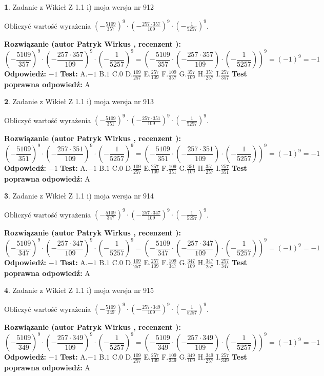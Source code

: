 \documentclass[12pt, a4paper]{article}
\theoremstyle{definition} %
\newtheorem{zad}{}
\newcommand{\zadStart}[1]{\begin{zad}#1\newline}
\newcommand{\zadStop}{\end{zad}}
\newcommand{\rozwStart}[2]{\noindent \textbf{Rozwiązanie (autor #1 , recenzent #2): }\newline}
\newcommand{\rozwStop}{\newline}
\newcommand{\odpStart}{\noindent \textbf{Odpowiedź:}\newline}
\newcommand{\odpStop}{\newline}
\newcommand{\testStart}{\noindent \textbf{Test:}\newline}
\newcommand{\testStop}{\newline}
\newcommand{\kluczStart}{\noindent \textbf{Test poprawna odpowiedź:}\newline}
\newcommand{\kluczStop}{\newline}
\begin{document}
\zadStart{Zadanie z Wikieł Z 1.1 i) moja wersja nr 912}

Obliczyć wartość wyrażenia $(-\frac{5109}{357})^{9} \cdot (-\frac{257 \cdot 357}{109})^{9} \cdot (-\frac{1}{5257})^{9}$.
\zadStop
\rozwStart{Patryk Wirkus}{}
$$(-\frac{5109}{357})^{9} \cdot (-\frac{257 \cdot 357}{109})^{9} \cdot (-\frac{1}{5257})^{9} = (-\frac{5109}{357} \cdot (-\frac{257 \cdot 357}{109}) \cdot (-\frac{1}{5257}))^{9} = (-1)^{9} = -1$$
\rozwStop
\odpStart
$-1$
\odpStop
\testStart
A.$-1$ B.$1$ C.$0$ D.$\frac{109}{257}$ E.$\frac{257}{109}$
F.$\frac{109}{357}$ G.$\frac{357}{109}$
H.$\frac{357}{257}$
I.$\frac{257}{357}$
\testStop
\kluczStart
A
\kluczStop



\zadStart{Zadanie z Wikieł Z 1.1 i) moja wersja nr 913}

Obliczyć wartość wyrażenia $(-\frac{5109}{351})^{9} \cdot (-\frac{257 \cdot 351}{109})^{9} \cdot (-\frac{1}{5257})^{9}$.
\zadStop
\rozwStart{Patryk Wirkus}{}
$$(-\frac{5109}{351})^{9} \cdot (-\frac{257 \cdot 351}{109})^{9} \cdot (-\frac{1}{5257})^{9} = (-\frac{5109}{351} \cdot (-\frac{257 \cdot 351}{109}) \cdot (-\frac{1}{5257}))^{9} = (-1)^{9} = -1$$
\rozwStop
\odpStart
$-1$
\odpStop
\testStart
A.$-1$ B.$1$ C.$0$ D.$\frac{109}{257}$ E.$\frac{257}{109}$
F.$\frac{109}{351}$ G.$\frac{351}{109}$
H.$\frac{351}{257}$
I.$\frac{257}{351}$
\testStop
\kluczStart
A
\kluczStop



\zadStart{Zadanie z Wikieł Z 1.1 i) moja wersja nr 914}

Obliczyć wartość wyrażenia $(-\frac{5109}{347})^{9} \cdot (-\frac{257 \cdot 347}{109})^{9} \cdot (-\frac{1}{5257})^{9}$.
\zadStop
\rozwStart{Patryk Wirkus}{}
$$(-\frac{5109}{347})^{9} \cdot (-\frac{257 \cdot 347}{109})^{9} \cdot (-\frac{1}{5257})^{9} = (-\frac{5109}{347} \cdot (-\frac{257 \cdot 347}{109}) \cdot (-\frac{1}{5257}))^{9} = (-1)^{9} = -1$$
\rozwStop
\odpStart
$-1$
\odpStop
\testStart
A.$-1$ B.$1$ C.$0$ D.$\frac{109}{257}$ E.$\frac{257}{109}$
F.$\frac{109}{347}$ G.$\frac{347}{109}$
H.$\frac{347}{257}$
I.$\frac{257}{347}$
\testStop
\kluczStart
A
\kluczStop



\zadStart{Zadanie z Wikieł Z 1.1 i) moja wersja nr 915}

Obliczyć wartość wyrażenia $(-\frac{5109}{349})^{9} \cdot (-\frac{257 \cdot 349}{109})^{9} \cdot (-\frac{1}{5257})^{9}$.
\zadStop
\rozwStart{Patryk Wirkus}{}
$$(-\frac{5109}{349})^{9} \cdot (-\frac{257 \cdot 349}{109})^{9} \cdot (-\frac{1}{5257})^{9} = (-\frac{5109}{349} \cdot (-\frac{257 \cdot 349}{109}) \cdot (-\frac{1}{5257}))^{9} = (-1)^{9} = -1$$
\rozwStop
\odpStart
$-1$
\odpStop
\testStart
A.$-1$ B.$1$ C.$0$ D.$\frac{109}{257}$ E.$\frac{257}{109}$
F.$\frac{109}{349}$ G.$\frac{349}{109}$
H.$\frac{349}{257}$
I.$\frac{257}{349}$
\testStop
\kluczStart
A
\kluczStop
\end{document}

